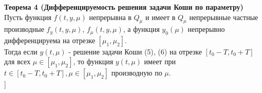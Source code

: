 \textbf{Теорема 4 (Дифференцируемость решения задачи Коши по параметру)}\\
Пусть функция $f(t,y,\mu)$ непрерывна в $Q_\mu$ и имеет в $Q_\mu$ непрерывные частные производные $f_y(t,y,\mu)$, $f_\mu(t,y,\mu)$, а функция $y_0(\mu)$ непрерывно дифференцируема на отрезке $[\mu_1,\mu_2]$.\\
Тогда если $y(t,\mu)$ - решение задачи Коши (5), (6) на отрезке $[t_0-T,t_0+T]$ для всех $\mu \in [\mu_1,\mu_2]$, то функция $y(t,\mu)$ имеет при $t\in [t_0-T,t_0+T], \mu \in [\mu_1,\mu_2]$ производную по $\mu$.\\


\bigbreak
[\cite[6-13]{denisov2}]
